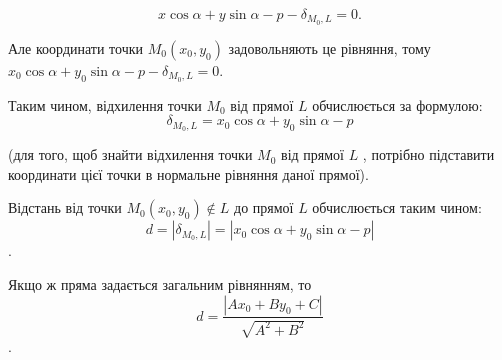 $$x\cos\alpha + y\sin\alpha - p - \delta_{M_0,L} = 0.$$

Але координати точки $M_0(x_0,y_0)$ задовольняють це рівняння, тому
$x_0\cos\alpha + y_0\sin\alpha - p - \delta_{M_0,L} = 0$.

Таким чином, відхилення точки $M_0$ від прямої $L$ обчислюється за формулою:
$$\delta_{M_0,L} = x_0\cos\alpha + y_0\sin\alpha - p$$

(для того, щоб знайти відхилення точки $M_0$ від прямої $L$ , потрібно підставити
координати цієї точки в нормальне рівняння даної прямої).

Відстань від точки $M_0(x_0,y_0) \not\in L$ до прямої $L$ обчислюється таким чином:
$$d = |\delta_{M_0,L}| = |x_0\cos\alpha + y_0\sin\alpha - p|$$.

Якщо ж пряма задається загальним рівнянням, то 
$$d = \dfrac{|Ax_0 + By_0 + C|}{\sqrt{A^2 + B^2}}$$.

